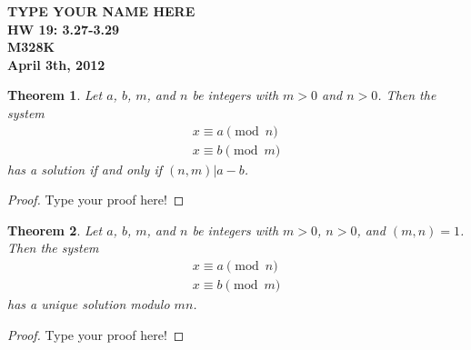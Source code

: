 \documentclass[12pt,leqno]{article}
\numberwithin{equation}{section}
\newtheorem{thm}{Theorem}[section]
\theoremstyle{definition}
\begin{document}
\thispagestyle{plain}
\begin{flushright}
\large{\textbf{TYPE YOUR NAME HERE \\
HW 19: 3.27-3.29\\
M328K \\
April 3th, 2012 \\}}
\end{flushright}

\markboth{}{} \setcounter{section}{0} \baselineskip=18pt

\setcounter{tocdepth}{4}



\setcounter{section}{3}

\setcounter{thm}{26}

\begin{thm}
Let $a$, $b$, $m$, and $n$ be integers with $m > 0$ and $n > 0$.
Then the system
\[ \begin{array}{l}
x \equiv a \pmod{n} \\
x \equiv b \pmod{m} \end{array} \] has a solution if and only if
$(n, m)| a - b$.
\end{thm}

\begin{proof}[Proof]
Type your proof here!
\end{proof}


\begin{thm}
Let $a$, $b$, $m$, and $n$ be integers with $m > 0$, $n > 0$, and
$(m,n)=1$.  Then the system
\[ \begin{array}{l}
x \equiv a \pmod{n} \\
x \equiv b \pmod{m} \end{array} \] has a unique solution modulo
$mn$.
\end{thm}

\begin{proof}[Proof]
Type your proof here!
\end{proof}
\end{document}
